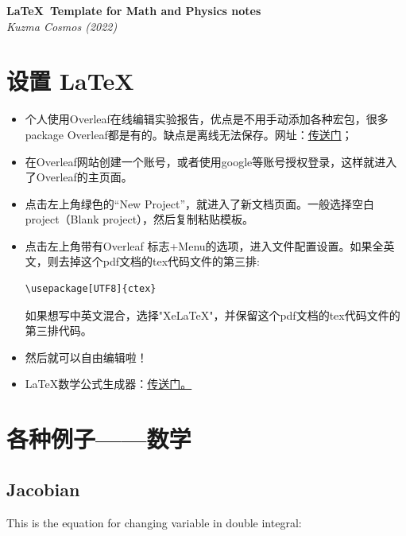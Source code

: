 \documentclass[12pt,a4paper,twoside]{article}
\numberwithin{equation}{section}
\begin{document}

\begin{center}
		\textbf{\Large{\LaTeX \ Template for Math and Physics notes}}\\
		\textit{Kuzma Cosmos (2022)}
	\end{center}
 
\section{设置 \LaTeX}

\begin{itemize}
    \item 个人使用Overleaf在线编辑实验报告，优点是不用手动添加各种宏包，很多package Overleaf都是有的。缺点是离线无法保存。网址：\href{https://www.overleaf.com/project}{传送门}；

    \item 在Overleaf网站创建一个账号，或者使用google等账号授权登录，这样就进入了Overleaf的主页面。

    \item 点击左上角绿色的“New Project”，就进入了新文档页面。一般选择空白project（Blank project），然后复制粘贴模板。

    \item 点击左上角带有Overleaf 标志+Menu的选项，进入文件配置设置。如果全英文，则去掉这个pdf文档的tex代码文件的第三排:
    \begin{verbatim}\usepackage[UTF8]{ctex} \end{verbatim}
    
    如果想写中英文混合，选择"XeLaTeX"，并保留这个pdf文档的tex代码文件的第三排代码。

    \item 然后就可以自由编辑啦！

    \item \LaTeX 数学公式生成器：\href{https://latex.codecogs.com/eqneditor/editor.php}{传送门。}
    
\end{itemize}


\newpage %

\section{各种例子——数学}

\subsection{Jacobian}
This is the equation for changing variable in double integral:
\end{document}
